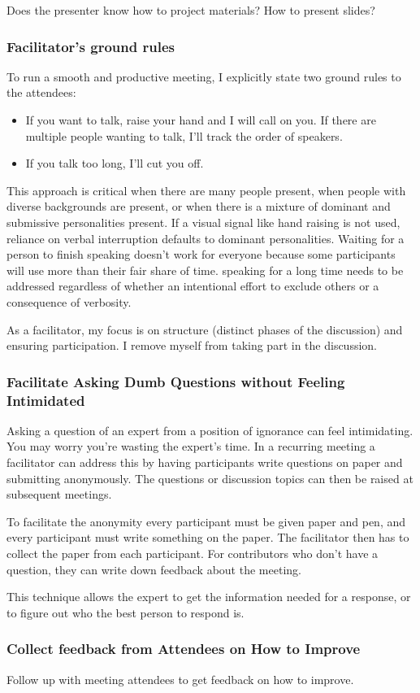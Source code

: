 Does the presenter know how to project materials? How to present slides?

\subsubsection{Facilitator's ground rules}

To run a smooth and productive meeting, I explicitly state two ground rules to the attendees:
\begin{itemize}
    \item If you want to talk, raise your hand and I will call on you. If there are multiple people wanting to talk, I'll track the order of speakers.
    \item If you talk too long, I'll cut you off. 
\end{itemize}
This approach is critical when there are many people present, when people with diverse backgrounds are present, or when there is a mixture of dominant and submissive personalities present. 
If a visual signal like hand raising is not used, reliance on verbal interruption defaults to dominant personalities. Waiting for a person to finish speaking doesn't work for everyone because some participants will use more than their fair share of time. speaking for a long time needs to be addressed regardless of whether an intentional effort to exclude others or a consequence of verbosity.

As a facilitator, my focus is on structure (distinct phases of the discussion) and ensuring participation. I remove myself from taking part in the discussion.

\subsubsection{Facilitate Asking Dumb Questions without Feeling Intimidated}

Asking a question of an expert from a position of ignorance can feel intimidating. You may worry you're wasting the expert's time. In a recurring meeting a facilitator can address this by having participants write questions on paper and submitting anonymously. The questions or discussion topics can then be raised at subsequent meetings. 

To facilitate the anonymity every participant must be given paper and pen, and every participant must write something on the paper. The facilitator then has to collect the paper from each participant. For contributors who don't have a question, they can write down feedback about the meeting. 

This technique allows the expert to get the information needed for a response, or to figure out who the best person to respond is. 

\subsubsection{Collect feedback from Attendees on How to Improve}

Follow up with meeting attendees to get feedback on how to improve.